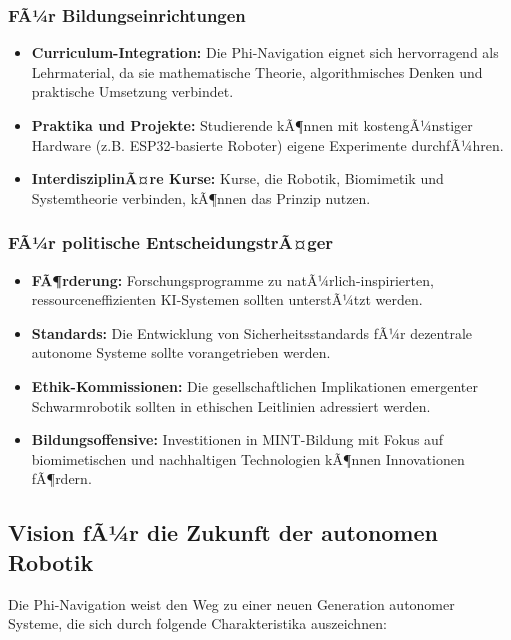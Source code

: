 ﻿\documentclass[a4paper,12pt]{article}
\theoremstyle{definition}
\begin{document}
\subsubsection{FÃ¼r Bildungseinrichtungen}

\begin{itemize}
	\item \textbf{Curriculum-Integration:} Die Phi-Navigation eignet sich hervorragend als Lehrmaterial, da sie mathematische Theorie, algorithmisches Denken und praktische Umsetzung verbindet.
	
	\item \textbf{Praktika und Projekte:} Studierende kÃ¶nnen mit kostengÃ¼nstiger Hardware (z.B. ESP32-basierte Roboter) eigene Experimente durchfÃ¼hren.
	
	\item \textbf{InterdisziplinÃ¤re Kurse:} Kurse, die Robotik, Biomimetik und Systemtheorie verbinden, kÃ¶nnen das Prinzip nutzen.
\end{itemize}

\subsubsection{FÃ¼r politische EntscheidungstrÃ¤ger}

\begin{itemize}
	\item \textbf{FÃ¶rderung:} Forschungsprogramme zu natÃ¼rlich-inspirierten, ressourceneffizienten KI-Systemen sollten unterstÃ¼tzt werden.
	
	\item \textbf{Standards:} Die Entwicklung von Sicherheitsstandards fÃ¼r dezentrale autonome Systeme sollte vorangetrieben werden.
	
	\item \textbf{Ethik-Kommissionen:} Die gesellschaftlichen Implikationen emergenter Schwarmrobotik sollten in ethischen Leitlinien adressiert werden.
	
	\item \textbf{Bildungsoffensive:} Investitionen in MINT-Bildung mit Fokus auf biomimetischen und nachhaltigen Technologien kÃ¶nnen Innovationen fÃ¶rdern.
\end{itemize}

\subsection{Vision fÃ¼r die Zukunft der autonomen Robotik}

Die Phi-Navigation weist den Weg zu einer neuen Generation autonomer Systeme, die sich durch folgende Charakteristika auszeichnen:
\end{document}
